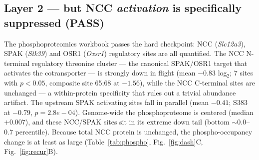 \documentclass[11pt]{article}
\newcommand{\pass}{\textcolor{green!55!black}{\textbf{PASS}}}
\begin{document}
\subsection{Layer 2 --- but NCC \emph{activation} is specifically suppressed (\pass{})}
The phosphoproteomics workbook passes the hard checkpoint: NCC (\textit{Slc12a3}), SPAK
(\textit{Stk39}) and OSR1 (\textit{Oxsr1}) regulatory sites are all quantified. The NCC
N-terminal regulatory threonine cluster --- the canonical SPAK/OSR1 target that activates
the cotransporter --- is strongly down in flight (mean
$-0.83$ log$_2$;
7 sites with $p<0.05$, composite site 65;68 at
$-1.56$),
while the NCC C-terminal sites are unchanged --- a within-protein specificity that rules out
a trivial abundance artifact. The upstream SPAK activating sites fall in parallel (mean
$-0.41$; S383 at
$-0.79$,
$p=2.8e-04$).
Genome-wide the phosphoproteome is centered (median $+0.007$), and these NCC/SPAK sites sit
in its extreme down tail (bottom $\sim$0.0--0.7 percentile). Because total NCC protein is
unchanged, the phospho-occupancy change is at least as large (Table~\ref{tab:phospho},
Fig.~\ref{fig:dash}C, Fig.~\ref{fig:recur}B).
\end{document}
